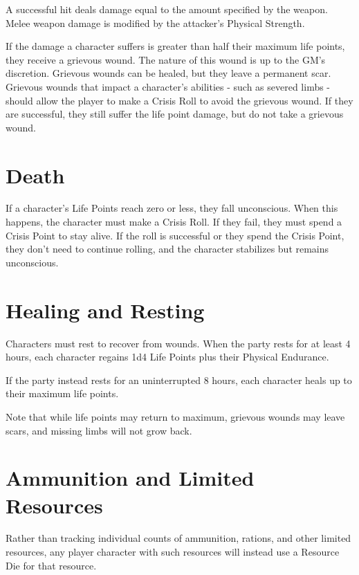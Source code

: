 \begin{multicols}{2}
A successful hit deals damage equal to the amount specified by
the weapon. Melee weapon damage is modified by the attacker's Physical Strength.

If the damage a character suffers is greater than half their maximum life points, they receive
a grievous wound. The nature of this wound is up to the GM's discretion.
Grievous wounds can be healed, but they leave a permanent scar. Grievous wounds that impact a
character's abilities - such as severed limbs - should allow the player to make a Crisis Roll
to avoid the grievous wound. If they are successful, they still suffer the life point damage,
but do not take a grievous wound.

\section{Death}

If a character's Life Points reach zero or less, they fall unconscious. When this happens,
the character must make a Crisis Roll. If they fail, they must spend a Crisis Point to stay
alive. If the roll is successful or they spend the Crisis Point, they don't need to continue
rolling, and the character stabilizes but remains unconscious.

\section{Healing and Resting}

Characters must rest to recover from wounds. When the party rests for at least 4 hours, each
character regains 1d4 Life Points plus their Physical Endurance.

If the party instead rests for an uninterrupted 8 hours, each character heals up to their maximum
life points.

Note that while life points may return to maximum, grievous wounds may leave scars, and missing
limbs will not grow back.

\section{Ammunition and Limited Resources}

Rather than tracking individual counts of ammunition, rations, and other limited resources, any
player character with such resources will instead use a Resource Die for that resource.


\end{multicols}
